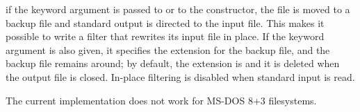  if the keyword argument
 is passed to  or to the
 constructor, the file is moved to a backup file and
standard output is directed to the input file.
This makes it possible to write a filter that rewrites its input file
in place.  If the keyword argument  is also given, it specifies the extension for the backup
file, and the backup file remains around; by default, the extension is
 and it is deleted when the output file is closed.  In-place
filtering is disabled when standard input is read.

 The current implementation does not work for MS-DOS
8+3 filesystems.
